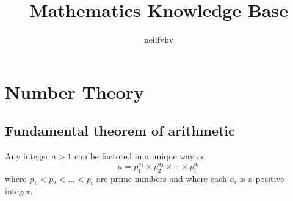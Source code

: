 \documentclass[a4paper, 11pt]{article}
\title{Mathematics Knowledge Base}
\author{neilfvhv}
\begin{document}
    
\maketitle

\section{Number Theory}
    
    \subsection{Fundamental theorem of arithmetic}
        Any integer $a > 1$ can be factored in a unique way as
        $$
            a = p_1^{a_1} \times p_2^{a_2} \times \cdots \times p_t^{a_t}
        $$
        where $p_1 < p_2 < \ldots < p_t$ are prime numbers and where each $a_i$ is a positive integer.
\end{document}
